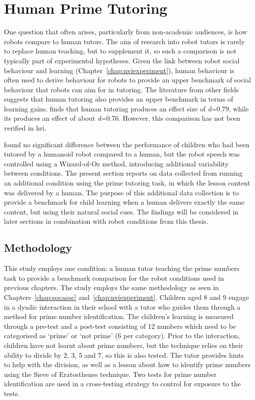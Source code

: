 \section{Human Prime Tutoring} \label{sec:disc-humanprimes}
One question that often arises, particularly from non-academic audiences, is how robots compare to human tutors. The aim of research into robot tutors is rarely to replace human teaching, but to supplement it, so such a comparison is not typically part of experimental hypotheses. Given the link between robot social behaviour and \gls{learning} (Chapter~\ref{chap:nviexperiment}), human behaviour is often used to derive behaviour for robots to provide an upper benchmark of social behaviour that robots can aim for in tutoring. The literature from other fields suggests that human tutoring also provides an upper benchmark in terms of \gls{learning} gains. \cite{vanlehn2011relative} finds that human tutoring produces an effect size of \textit{d}=0.79, while \acrshort{its} produces an effect of about \textit{d}=0.76. However, this comparison has not been verified in \acrshort{hri}. 

\cite{serholt2014comparing} found no significant difference between the performance of children who had been tutored by a humanoid robot compared to a human, but the robot speech was controlled using a Wizard-of-Oz method, introducing additional variability between conditions. The present section reports on data collected from running an additional condition using the prime tutoring task, in which the lesson content was delivered by a human. The purpose of this additional data collection is to provide a benchmark for child \gls{learning} when a human delivers exactly the same content, but using their natural social cues. The findings will be considered in later sections in combination with robot conditions from this thesis.

\subsection{Methodology}
This study employs one condition: a human tutor teaching the prime numbers task to provide a benchmark comparison for the robot conditions used in previous chapters. The study employs the same methodology as seen in Chapters~\ref{chap:socasoc} and~\ref{chap:nviexperiment}. Children aged 8 and 9 engage in a dyadic interaction in their school with a tutor who guides them through a method for prime number identification. The children's \gls{learning} is measured through a pre-test and a post-test consisting of 12 numbers which need to be categorised as `prime' or `not prime' (6 per category). Prior to the interaction, children have not learnt about prime numbers, but the technique relies on their ability to divide by 2, 3, 5 and 7, so this is also tested. The tutor provides hints to help with the division, as well as a lesson about how to identify prime numbers using the Sieve of Eratosthenes technique. Two tests for prime number identification are used in a cross-testing strategy to control for exposure to the tests.

